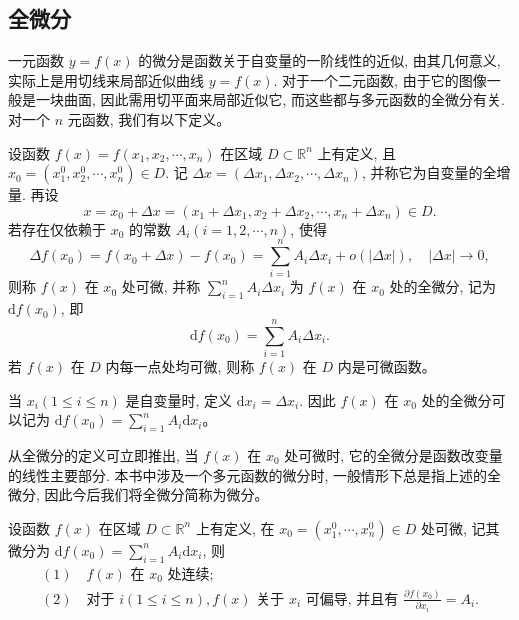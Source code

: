 \documentclass[UTF8,12pt,a4paper,fontset=fandol]{ctexart}
\begin{document}
\subsection{全微分}

一元函数 $y=f(x)$ 的微分是函数关于自变量的一阶线性的近似, 由其几何意义, 实际上是用切线来局部近似曲线 $y=f(x)$. 对于一个二元函数, 由于它的图像一般是一块曲面, 因此需用切平面来局部近似它, 而这些都与多元函数的全微分有关. 对一个 $n$ 元函数, 我们有以下定义。

\begin{definition}\label{course-definition-14-1-3}\quad 设函数 $f(x)=f(x_1,x_2,\cdots,x_n)$ 在区域 $D\subset\mathbb R^n$ 上有定义, 且 $x_0=(x_1^0,x_2^0,\cdots,x_n^0)\in D$. 记 $\Delta x=(\Delta x_1,\Delta x_2,\cdots,\Delta x_n)$, 并称它为自变量的全增量. 再设
\[
  x=x_0+\Delta x=(x_1+\Delta x_1,x_2+\Delta x_2,\cdots,x_n+\Delta x_n)\in D.
\]
若存在仅依赖于 $x_0$ 的常数 $A_i(i=1,2,\cdots,n)$, 使得
\[
  \Delta f(x_0)=f(x_0+\Delta x)-f(x_0)
  =\sum_{i=1}^n A_i\Delta x_i+o(|\Delta x|),\quad |\Delta x|\to0,
\]
则称 $f(x)$ 在 $x_0$ 处可微, 并称 $\sum\limits_{i=1}^n A_i\Delta x_i$ 为 $f(x)$ 在 $x_0$ 处的全微分, 记为 $\mathrm df(x_0)$, 即
\[
  \mathrm df(x_0)=\sum_{i=1}^n A_i\Delta x_i.
\]
若 $f(x)$ 在 $D$ 内每一点处均可微, 则称 $f(x)$ 在 $D$ 内是可微函数。

当 $x_i(1\leqslant i\leqslant n)$ 是自变量时, 定义 $\mathrm dx_i=\Delta x_i$. 因此 $f(x)$ 在 $x_0$ 处的全微分可以记为 $\mathrm df(x_0)=\sum\limits_{i=1}^n A_i\mathrm dx_i$。

从全微分的定义可立即推出, 当 $f(x)$ 在 $x_0$ 处可微时, 它的全微分是函数改变量的线性主要部分. 本书中涉及一个多元函数的微分时, 一般情形下总是指上述的全微分, 因此今后我们将全微分简称为微分。

\end{definition}
\begin{theorem}\label{course-theorem-14-1-1}\quad 设函数 $f(x)$ 在区域 $D\subset\mathbb R^n$ 上有定义, 在 $x_0=(x_1^0,\cdots,x_n^0)\in D$ 处可微, 记其微分为 $\mathrm df(x_0)=\sum\limits_{i=1}^n A_i\mathrm dx_i$, 则
\[
\begin{gathered}
  (1)\quad f(x)\text{ 在 }x_0\text{ 处连续};\\
  (2)\quad \text{对于 } i(1\leqslant i\leqslant n), f(x)\text{ 关于 }x_i\text{ 可偏导, 并且有 }
  \frac{\partial f(x_0)}{\partial x_i}=A_i.
\end{gathered}
\]

\end{theorem}
\end{document}
